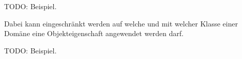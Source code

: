 TODO: Beispiel.


Dabei kann eingeschränkt werden auf welche und mit welcher Klasse einer Domäne eine Objekteigenschaft angewendet werden darf.

TODO: Beispiel.

% 
% 
% 
% 
